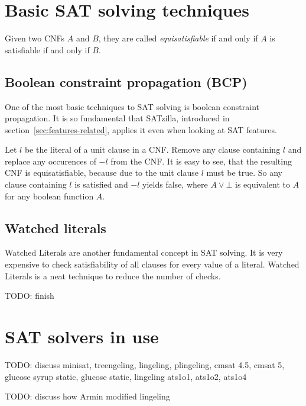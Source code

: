 \section{Basic SAT solving techniques}
\label{sec:sat-solving}
%
\begin{defi}
  Given two CNFs $A$ and $B$, they are called \emph{equisatisfiable} if and only
  if $A$ is satisfiable if and only if $B$.
\end{defi}

\subsection{Boolean constraint propagation (BCP)}
\label{sec:sat-bcp}
%
One of the most basic techniques to SAT solving is boolean constraint propagation.
It is so fundamental that SATzilla, introduced in section~\ref{sec:features-related},
applies it even when looking at SAT features.

Let $l$ be the literal of a unit clause in a CNF. Remove any clause containing
$l$ and replace any occurences of $-l$ from the CNF. It is easy to see, that
the resulting CNF is equisatisfiable, because due to the unit clause $l$ must
be true. So any clause containing $l$ is satisfied and $-l$ yields false,
where $A \lor \bot$ is equivalent to $A$ for any boolean function $A$.

\subsection{Watched literals}
\label{sec:sat-wl}
%
Watched Literals are another fundamental concept in SAT solving. It is very
expensive to check satisfiability of all clauses for every value of a literal.
Watched Literals is a neat technique to reduce the number of checks.

TODO: finish


\section{SAT solvers in use}
\label{sec:sat-solvers}
%
TODO: discuss minisat, treengeling, lingeling, plingeling, cmsat 4.5, cmsat 5, glucose syrup static, glucose static, lingeling ats1o1, ats1o2, ats1o4

TODO: discuss how Armin modified lingeling
